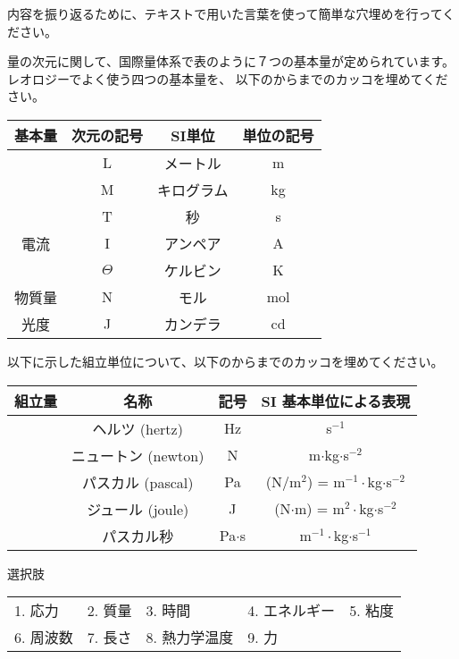 \documentclass[uplatex,dvipdfmx,a4paper,11pt]{jsarticle}
\begin{document}
内容を振り返るために、テキストで用いた言葉を使って簡単な穴埋めを行ってください。
\begin{qlist}
  \qitem 量の次元に関して、国際量体系で表のように７つの基本量が定められています。レオロジーでよく使う四つの基本量を、
  以下のからまでのカッコを埋めてください。
	\begin{center}
		\begin{tabular}{|c|c||c|c|} \hline
			基本量 		& 次元の記号 & SI単位 		& 単位の記号\\ \hline \hline
			\qbox{}		& L			& メートル 		& m \\ \hline
			\qbox{}		& M			& キログラム 	& kg \\ \hline
			\qbox{}		& T			& 秒 			& s \\ \hline
			電流		& I			& アンペア 		& A \\ \hline
			\qbox{}	& $\Theta$	& ケルビン 		& K \\ \hline
			物質量		& N			& モル 			& mol \\ \hline
			光度		& J			& カンデラ 		& cd \\ \hline
		\end{tabular}
	\end{center}

	\qitem 以下に示した組立単位について、以下のからまでのカッコを埋めてください。
	\begin{center}
		\begin{tabular}{|c|c||c|c|} \hline
			組立量 		& 名称					& 記号		& SI 基本単位による表現 	\\ \hline \hline
			\qbox{}		& ヘルツ (hertz)		& Hz		&  s$^{-1}$ 					\\ \hline
			\qbox{}		& ニュートン (newton)	& N 		& m$\cdot$kg$\cdot$s$^{-2}$ 	\\ \hline
			\qbox{}		& パスカル (pascal)		& Pa 		& (N/m$^2$) = m$^{-1}\cdot$kg$\cdot$s$^{-2}$ \\ \hline
			\qbox{}	& ジュール (joule)		& J 		& (N$\cdot$m) = m$^{2}\cdot$kg$\cdot$s$^{-2}$ \\ \hline
			\qbox{}		& パスカル秒			& Pa$\cdot$s & m$^{-1}\cdot$kg$\cdot$s$^{-1}$ \\ \hline
		\end{tabular}
  \end{center}
  
  \begin{itembox}[l]{選択肢}
    \begin{center}
      \begin{tabular}{lllll}
        1. 応力&2. 質量&3. 時間&4. エネルギー&5. 粘度\\
        6. 周波数&7. 長さ&8. 熱力学温度&9. 力
      \end{tabular}
    \end{center}
  \end{itembox}
\end{qlist}
\end{document}
